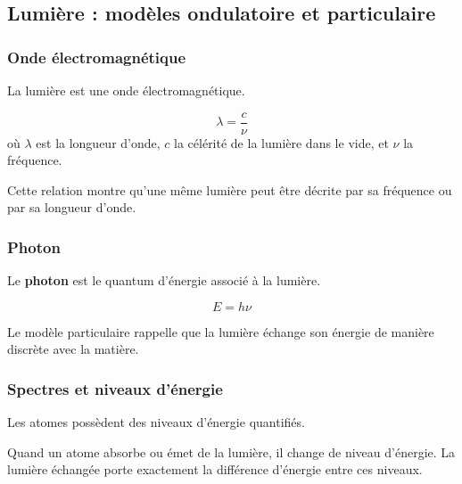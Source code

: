 \documentclass[11pt,a4paper]{article}
\begin{document}
\subsection{Lumière : modèles ondulatoire et particulaire}

\subsubsection{Onde électromagnétique}

\begin{definitionbox}
La lumière est une onde électromagnétique.
\end{definitionbox}

\begin{proprbox}
\[
\lambda=\frac{c}{\nu}
\]
où \(\lambda\) est la longueur d'onde, \(c\) la célérité de la lumière dans le vide, et \(\nu\) la fréquence.
\end{proprbox}

\begin{sensbox}
Cette relation montre qu'une même lumière peut être décrite par sa fréquence ou par sa longueur d'onde.
\end{sensbox}

\subsubsection{Photon}

\begin{definitionbox}
Le \textbf{photon} est le quantum d'énergie associé à la lumière.
\end{definitionbox}

\begin{proprbox}
\[
E=h\nu
\]
\end{proprbox}

\begin{sensbox}
Le modèle particulaire rappelle que la lumière échange son énergie de manière discrète avec la matière.
\end{sensbox}

\subsubsection{Spectres et niveaux d'énergie}

\begin{definitionbox}
Les atomes possèdent des niveaux d'énergie quantifiés.
\end{definitionbox}

\begin{sensbox}
Quand un atome absorbe ou émet de la lumière, il change de niveau d'énergie.  
La lumière échangée porte exactement la différence d'énergie entre ces niveaux.
\end{sensbox}
\end{document}
